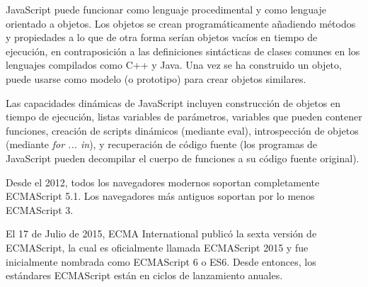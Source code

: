JavaScript puede funcionar como lenguaje procedimental y como lenguaje orientado a objetos. Los objetos se crean programáticamente añadiendo métodos y propiedades a lo que de otra forma serían objetos vacíos en tiempo de ejecución, en contraposición a las definiciones sintácticas de clases comunes en los lenguajes compilados como C++ y Java. Una vez se ha construido un objeto, puede usarse como modelo (o prototipo) para crear objetos similares.

Las capacidades dinámicas de JavaScript incluyen construcción de objetos en tiempo de ejecución, listas variables de parámetros, variables que pueden contener funciones, creación de scripts dinámicos (mediante eval), introspección de objetos (mediante \textit{for ... in}), y recuperación de código fuente (los programas de JavaScript pueden decompilar el cuerpo de funciones a su código fuente original).

Desde el 2012, todos los navegadores modernos soportan completamente ECMAScript 5.1. Los navegadores más antiguos soportan por lo menos ECMAScript 3. 


El 17 de Julio de 2015, ECMA International publicó la sexta versión de ECMAScript, la cual es oficialmente llamada ECMAScript 2015 y fue inicialmente nombrada como ECMAScript 6 o ES6. Desde entonces, los estándares ECMAScript están en ciclos de lanzamiento anuales.



